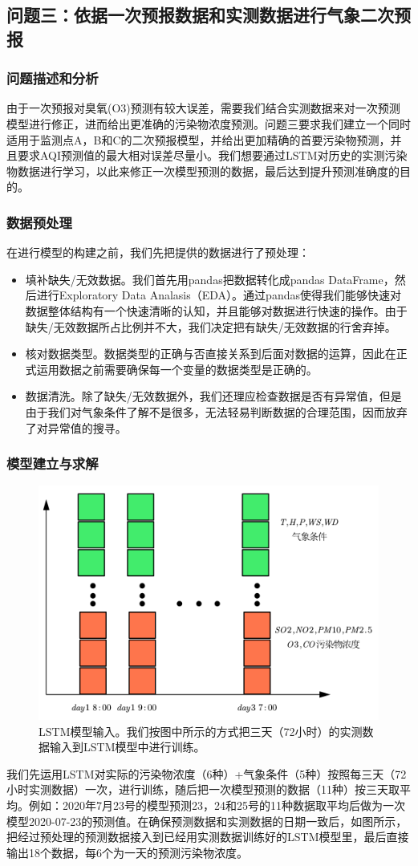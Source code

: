 \documentclass[bwprint]{gmcmthesis}
\numberwithin{figure}{section}
\begin{document}
\subsection{问题三：依据一次预报数据和实测数据进行气象二次预报}
\subsubsection{问题描述和分析}
由于一次预报对臭氧(O3)预测有较大误差，需要我们结合实测数据来对一次预测模型进行修正，进而给出更准确的污染物浓度预测。问题三要求我们建立一个同时适用于监测点A，B和C的二次预报模型，并给出更加精确的首要污染物预测，并且要求AQI预测值的最大相对误差尽量小。我们想要通过LSTM对历史的实测污染物数据进行学习，以此来修正一次模型预测的数据，最后达到提升预测准确度的目的。
\subsubsection{数据预处理}
在进行模型的构建之前，我们先把提供的数据进行了预处理：
\begin{itemize}
	\item 填补缺失/无效数据。我们首先用pandas把数据转化成pandas DataFrame，然后进行Exploratory Data Analasis（EDA）。通过pandas使得我们能够快速对数据整体结构有一个快速清晰的认知，并且能够对数据进行快速的操作。由于缺失/无效数据所占比例并不大，我们决定把有缺失/无效数据的行舍弃掉。
	\item 核对数据类型。数据类型的正确与否直接关系到后面对数据的运算，因此在正式运用数据之前需要确保每一个变量的数据类型是正确的。
	\item 数据清洗。除了缺失/无效数据外，我们还理应检查数据是否有异常值，但是由于我们对气象条件了解不是很多，无法轻易判断数据的合理范围，因而放弃了对异常值的搜寻。
\end{itemize}
\subsubsection{模型建立与求解}
\begin{figure}[!h]
	\centering
	\includegraphics[width=.7\textwidth]{LSTM_input.png}
	\caption{LSTM模型输入。我们按图中所示的方式把三天（72小时）的实测数据输入到LSTM模型中进行训练。}
	\label{LSTM-INPUT}
\end{figure}
我们先运用LSTM对实际的污染物浓度（6种）+气象条件（5种）按照每三天（72小时实测数据）一次，进行训练，随后把一次模型预测的数据（11种）按三天取平均。例如：2020年7月23号的模型预测23，24和25号的11种数据取平均后做为一次模型2020-07-23的预测值。在确保预测数据和实测数据的日期一致后，如图所示，把经过预处理的预测数据接入到已经用实测数据训练好的LSTM模型里，最后直接输出18个数据，每6个为一天的预测污染物浓度。
\end{document}
